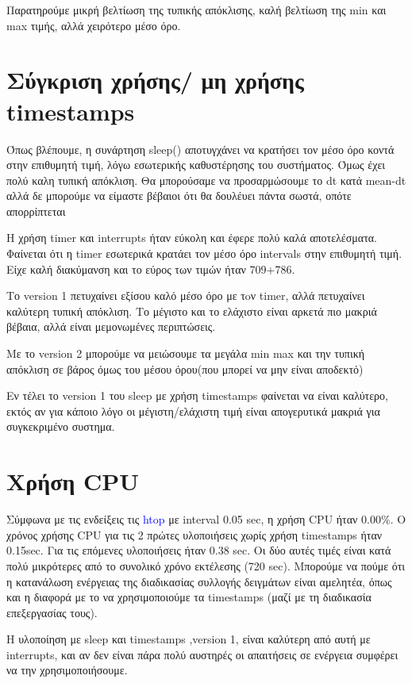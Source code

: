 \documentclass[12pt,a4paper]{article}
\begin{document}
Παρατηρούμε μικρή βελτίωση της τυπικής απόκλισης, καλή βελτίωση της min και max  τιμής,  αλλά χειρότερο μέσο όρο.


\section{Σύγκριση χρήσης/ μη χρήσης timestamps}

Όπως βλέπουμε, η συνάρτηση sleep() αποτυγχάνει να κρατήσει τον μέσο όρο κοντά στην επιθυμητή τιμή, λόγω εσωτερικής καθυστέρησης του συστήματος. Όμως έχει πολύ καλη τυπική απόκλιση. Θα μπορούσαμε να προσαρμώσουμε το dt κατά mean-dt αλλά δε μπορούμε να είμαστε βέβαιοι ότι θα δουλέυει πάντα σωστά, οπότε απορρίπτεται

Η χρήση timer και interrupts ήταν εύκολη και έφερε πολύ καλά αποτελέσματα. Φαίνεται ότι η timer εσωτερικά κρατάει τον μέσο όρο intervals στην επιθυμητή τιμή. Είχε καλή διακύμανση και το εύρος των τιμών ήταν 709+786.

Το version 1 πετυχαίνει εξίσου καλό μέσο όρο με τoν timer, αλλά πετυχαίνει καλύτερη τυπική απόκλιση. Το μέγιστο και το ελάχιστο είναι αρκετά πιο μακριά βέβαια, αλλά είναι μεμονωμένες περιπτώσεις.


Με το version 2 μπορούμε να μειώσουμε τα μεγάλα min max και την τυπική απόκλιση σε βάρος όμως του μέσου όρου(που μπορεί να μην είναι αποδεκτό)


Εν τέλει το version 1 του sleep με χρήση timestamps φαίνεται να είναι καλύτερο, εκτός αν για κάποιο λόγο οι μέγιστη/ελάχιστη τιμή είναι απογερυτικά μακριά για συγκεκριμένο συστημα.

\section{Χρήση CPU}

Σύμφωνα με τις ενδείξεις τις \textcolor{blue}{htop} με interval 0.05 sec, η χρήση CPU ήταν $0.00\%$.  Ο χρόνος χρήσης CPU για τις 2 πρώτες υλοποιήσεις χωρίς χρήση timestamps ήταν 0.15sec. Για τις επόμενες υλοποιήσεις ήταν 0.38 sec. Οι δύο αυτές τιμές είναι κατά πολύ μικρότερες από το συνολικό χρόνο εκτέλεσης (720 sec). 
Μπορούμε να πούμε ότι η κατανάλωση ενέργειας της διαδικασίας συλλογής δειγμάτων είναι αμελητέα, όπως και η διαφορά με το να χρησιμοποιούμε τα timestamps (μαζί με τη διαδικασία επεξεργασίας τους).

Η υλοποίηση με sleep και timestamps ,version 1, είναι καλύτερη από αυτή με interrupts, και αν δεν είναι πάρα πολύ αυστηρές οι απαιτήσεις σε ενέργεια συμφέρει να την χρησιμοποιήσουμε.
\end{document}
